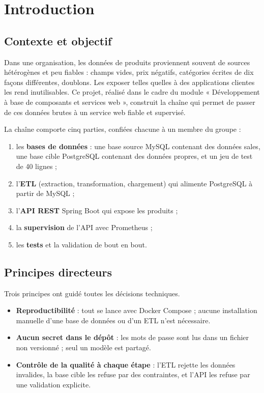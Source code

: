 \documentclass[11pt,a4paper]{article}
\newcommand{\code}[1]{\texttt{\detokenize{#1}}}
\begin{document}
\tableofcontents
\clearpage

\section{Introduction}

\subsection{Contexte et objectif}

Dans une organisation, les données de produits proviennent souvent de sources hétérogènes et peu fiables :
champs vides, prix négatifs, catégories écrites de dix façons différentes, doublons. Les exposer telles quelles
à des applications clientes les rend inutilisables. Ce projet, réalisé dans le cadre du module
« Développement à base de composants et services web », construit la chaîne qui permet de passer de ces
données brutes à un service web fiable et supervisé.

La chaîne comporte cinq parties, confiées chacune à un membre du groupe :
\begin{enumerate}
  \item les \textbf{bases de données} : une base source MySQL contenant des données sales, une base cible
        PostgreSQL contenant des données propres, et un jeu de test de 40 lignes ;
  \item l'\textbf{ETL} (extraction, transformation, chargement) qui alimente PostgreSQL à partir de MySQL ;
  \item l'\textbf{API REST} Spring Boot qui expose les produits ;
  \item la \textbf{supervision} de l'API avec Prometheus ;
  \item les \textbf{tests} et la validation de bout en bout.
\end{enumerate}

\subsection{Principes directeurs}

Trois principes ont guidé toutes les décisions techniques.
\begin{itemize}
  \item \textbf{Reproductibilité} : tout se lance avec Docker Compose ; aucune installation manuelle
        d'une base de données ou d'un ETL n'est nécessaire.
  \item \textbf{Aucun secret dans le dépôt} : les mots de passe sont lus dans un fichier \code{.env}
        non versionné ; seul un modèle \code{.env.example} est partagé.
  \item \textbf{Contrôle de la qualité à chaque étape} : l'ETL rejette les données invalides, la base cible
        les refuse par des contraintes, et l'API les refuse par une validation explicite.
\end{itemize}
\end{document}
